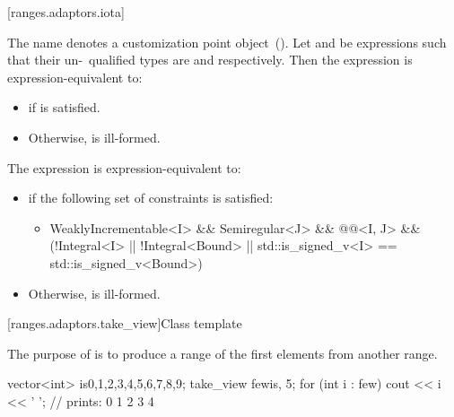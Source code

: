 [ranges.adaptors.iota]{}

\pnum
The name  denotes a customization point object~().
Let  and  be expressions such that their un-\cv\ qualified types
are  and  respectively. Then the expression 
is expression-equivalent to:

\begin{itemize}
\item {} if  is satisfied.
\item Otherwise,  is ill-formed.
\end{itemize}

\pnum
The expression  is expression-equivalent to:

\begin{itemize}
\item {} if the following set of constraints
is satisfied:
\begin{itemize}
\item \begin{codeblock}
WeaklyIncrementable<I> && Semiregular<J> &&
@@<I, J> &&
(!Integral<I> || !Integral<Bound> || std::is_signed_v<I> == std::is_signed_v<Bound>)
\end{codeblock}
\end{itemize}
\item Otherwise,  is ill-formed.
\end{itemize}

[ranges.adaptors.take_view]{Class template }

\pnum
The purpose of  is to produce a range of the first
 elements from another range.

\pnum
\enterexample
\begin{codeblock}
vector<int> is{0,1,2,3,4,5,6,7,8,9};
take_view few{is, 5};
for (int i : few)
  cout << i << ' '; // prints: 0 1 2 3 4
\end{codeblock}
\exitexample

